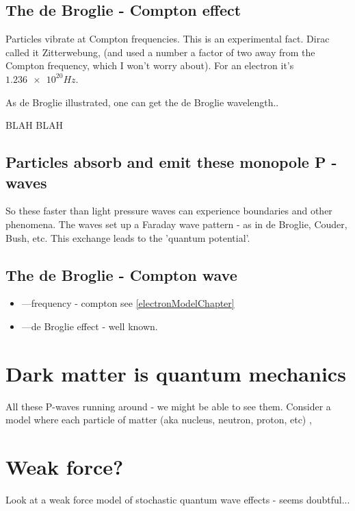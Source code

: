 \documentclass[../rzero]{subfiles}
\begin{document}
\subsection{The de Broglie - Compton effect}
Particles vibrate at Compton frequencies. This is an experimental fact. Dirac called it Zitterwebung, (and used a number a factor of two away from the Compton frequency, which I won't worry about). For an electron it's $\num{1.236e20} Hz$. 

As de Broglie illustrated, one can get the de Broglie wavelength..

BLAH BLAH



\subsection{Particles absorb and emit these monopole P - waves}
So these faster than light pressure waves can experience boundaries and other phenomena. The waves set up a Faraday wave pattern - as in de Broglie, Couder, Bush, etc. This exchange leads to the 'quantum potential'. 




\subsection{The de Broglie - Compton wave}
\begin{itemize}
  \item ---frequency - compton see \ref{electronModelChapter}
  \item ---de Broglie effect - well known.
 \end{itemize}


\section{Dark matter is quantum mechanics}
	All these P-waves running around - we might be able to see them. Consider a model where each particle of matter (aka nucleus, neutron, proton, etc) , 

\section{Weak force?}
	Look at a weak force model of stochastic quantum wave effects - seems doubtful... 
\end{document}
